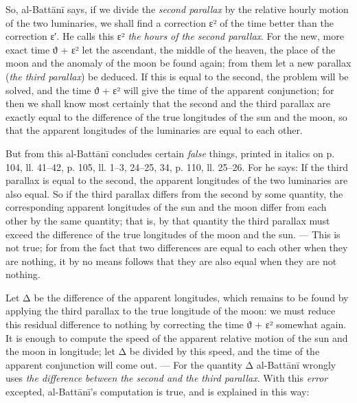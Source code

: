 \documentclass[11pt]{article}
\begin{document}
\par So, al-Battānī says, if we divide the \emph{second parallax} by the relative hourly motion of the two luminaries, we shall find a correction {\greekfont ε}² of the time better than the correction {\greekfont ε}′. He calls this {\greekfont ε}² \emph{the hours of the second parallax}. For the new, more exact time {\greekfont ϑ} + {\greekfont ε}² let the ascendant, the middle of the heaven, the place of the moon and the anomaly of the moon be found again; from them let a new parallax (\emph{the third parallax}) be deduced. If this is equal to the second, the problem will be solved, and the time {\greekfont ϑ} + {\greekfont ε}² will give the time of the apparent conjunction; for then we shall know most certainly that the second and the third parallax are exactly equal to the difference of the true longitudes of the sun and the moon, so that the apparent longitudes of the luminaries are equal to each other.\par
\par But from this al-Battānī concludes certain \emph{false} things, printed in italics on p. 104, ll. 41–42, p. 105, ll. 1–3, 24–25, 34, p. 110, ll. 25–26. For he says: If the third parallax is equal to the second, the apparent longitudes of the two luminaries are also equal. So if the third parallax differs from the second by some quantity, the corresponding apparent longitudes of the sun and the moon differ from each other by the same quantity; that is, by that quantity the third parallax must exceed the difference of the true longitudes of the moon and the sun. — This is not true; for from the fact that two differences are equal to each other when they are nothing, it by no means follows that they are also equal when they are not nothing.\par
\par Let {\greekfont Δ} be the difference of the apparent longitudes, which remains to be found by applying the third parallax to the true longitude of the moon: we must reduce this residual difference to nothing by correcting the time {\greekfont ϑ} + {\greekfont ε}² somewhat again. It is enough to compute the speed of the apparent relative motion of the sun and the moon in longitude; let {\greekfont Δ} be divided by this speed, and the time of the apparent conjunction will come out. — For the quantity {\greekfont Δ} al-Battānī wrongly uses \emph{the difference between the second and the third parallax}. With this \emph{error} excepted, al-Battānī's computation is true, and is explained in this way:\par
\end{document}
